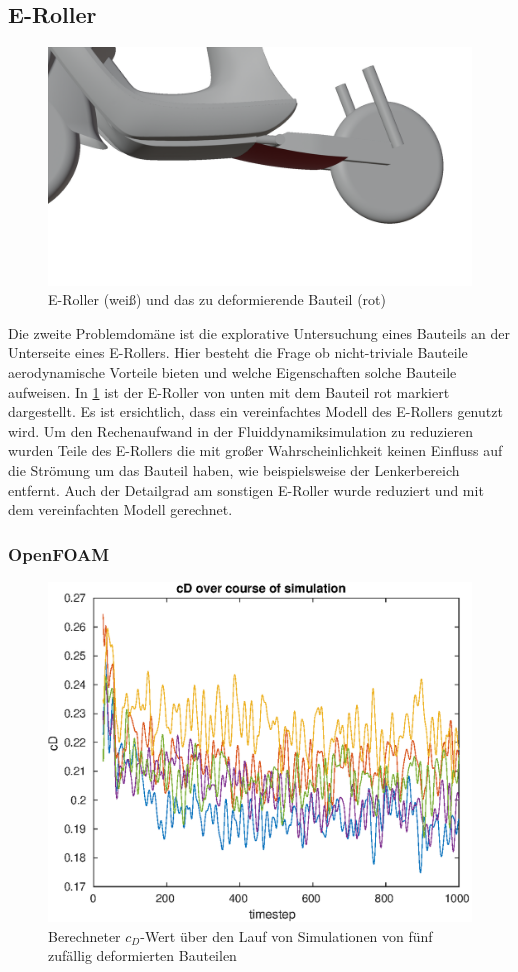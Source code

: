\subsection{E-Roller}
\label{sub:method_escooter}
\begin{figure}[h]
	\centering
	\includegraphics[width=.8\linewidth]{bilder/escooter_component}
	\caption{E-Roller (weiß) und das zu deformierende Bauteil (rot)}
	\label{fig:escooter_component}
\end{figure}

Die zweite Problemdomäne ist die explorative Untersuchung eines Bauteils an der Unterseite eines E-Rollers.
Hier besteht die Frage ob nicht-triviale Bauteile aerodynamische Vorteile bieten und welche Eigenschaften solche Bauteile aufweisen.
In \cref{fig:escooter_component} ist der E-Roller von unten mit dem Bauteil rot markiert dargestellt.
Es ist ersichtlich, dass ein vereinfachtes Modell des E-Rollers genutzt wird.
Um den Rechenaufwand in der Fluiddynamiksimulation zu reduzieren wurden Teile des E-Rollers die mit großer Wahrscheinlichkeit keinen Einfluss auf die Strömung um das Bauteil haben, wie beispielsweise der Lenkerbereich entfernt.
Auch der Detailgrad am sonstigen E-Roller wurde reduziert und mit dem vereinfachten Modell gerechnet.

\subsubsection{OpenFOAM}

\begin{figure}[h]
	\centering
	\includegraphics[width=.8\linewidth]{bilder/escooterCDConvergence}
	\caption{Berechneter $c_D$-Wert über den Lauf von Simulationen von fünf zufällig deformierten Bauteilen}
	\label{fig:escooter_convergence}
\end{figure}


